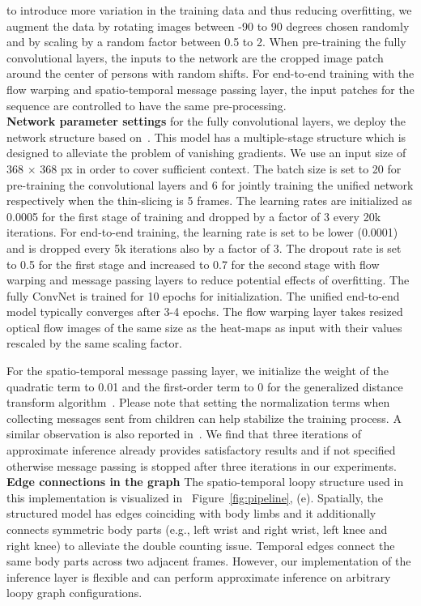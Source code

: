 \documentclass[10pt,twocolumn,letterpaper]{article}
\newcommand{\figref}[1]{Figure~\ref{#1}}
\begin{document}
to introduce more variation in the training data and thus reducing overfitting, we augment the data by rotating images between -90 to 90 degrees chosen randomly and by scaling by a random factor between 0.5 to 2. When pre-training the fully convolutional layers, the inputs to the network are the cropped image patch around the center of persons with random shifts. For end-to-end training with the flow warping and spatio-temporal message passing layer, the input patches for the sequence are controlled to have the same pre-processing.  \\

\noindent\textbf{Network parameter settings}
for the fully convolutional layers, we deploy the network structure based on~\cite{wei2016cpm}. This model has a multiple-stage structure which is designed to alleviate the problem of vanishing gradients. We use an input size of 368 $\times$ 368 px in order to cover sufficient context. The batch size is set to 20 for pre-training the convolutional layers and 6 for jointly training the unified network respectively when the thin-slicing is 5 frames. The learning rates are initialized as 0.0005 for the first stage of training and dropped by a factor of 3 every 20k iterations. For end-to-end training, the learning rate is set to be lower (0.0001) and is dropped every 5k iterations also by a factor of 3. The dropout rate is set to 0.5 for the first stage and increased to 0.7 for the second stage with flow warping and message passing layers to reduce potential effects of overfitting. The fully ConvNet is trained for 10 epochs for initialization. The unified end-to-end model typically converges after 3-4 epochs. The flow warping layer takes resized optical flow images of the same size as the heat-maps as input with their values rescaled by the same scaling factor.

For the spatio-temporal message passing layer, we initialize the weight of the quadratic term to 0.01 and the first-order term to 0 for the generalized distance transform algorithm~\cite{felzenszwalb2004distance}. Please note that setting the normalization terms when collecting messages sent from children can help stabilize the training process. A similar observation is also reported in~\cite{yang2016end}. We find that three iterations of approximate inference already provides satisfactory results and if not specified otherwise message passing is stopped after three iterations in our experiments.\\

\noindent\textbf{Edge connections in the graph}
The spatio-temporal loopy structure used in this implementation is visualized in ~\figref{fig:pipeline}, (e). Spatially, the
structured model has edges coinciding with body limbs and it additionally connects symmetric body parts (e.g., left wrist and right wrist, left knee and right knee) to alleviate the double counting issue. Temporal edges connect the same body parts across two adjacent frames. However, our implementation of the inference layer is flexible and can perform approximate inference on arbitrary loopy graph configurations.
\end{document}

